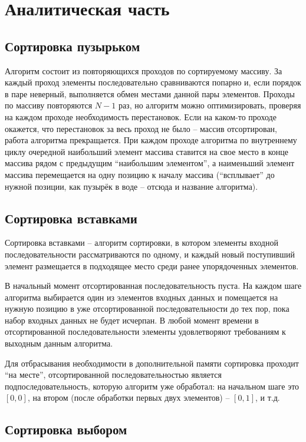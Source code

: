 \chapter{Аналитическая часть}

\section{Сортировка пузырьком}

Алгоритм состоит из повторяющихся проходов по сортируемому массиву.
За каждый проход элементы последовательно сравниваются попарно и, если порядок в паре неверный, выполняется обмен местами данной пары элементов.
Проходы по массиву повторяются $N-1$ раз, но алгоритм можно оптимизировать, проверяя на каждом проходе необходимость перестановок. Если на каком-то проходе окажется, что перестановок за весь проход не было -- массив отсортирован, работа алгоритма прекращается.
При каждом проходе алгоритма по внутреннему циклу очередной наибольший элемент массива ставится на свое место в конце массива рядом с предыдущим ``наибольшим элементом'', а наименьший элемент массива перемещается на одну позицию к началу массива (``всплывает'' до нужной позиции, как пузырёк в воде -- отсюда и название алгоритма).

\section{Сортировка вставками}

Сортировка вставками -- алгоритм сортировки, в котором элементы входной последовательности рассматриваются по одному, и каждый новый поступивший элемент размещается в подходящее место среди ранее упорядоченных элементов.

В начальный момент отсортированная последовательность пуста.
На каждом шаге алгоритма выбирается один из элементов входных данных и помещается на нужную позицию в уже отсортированной последовательности до тех пор, пока набор входных данных не будет исчерпан.
В любой момент времени в отсортированной последовательности элементы удовлетворяют требованиям к выходным данным алгоритма.

Для отбрасывания необходимости в дополнительной памяти сортировка проходит ``на месте'', отсортированной последовательностью является подпоследовательность, которую алгоритм уже обработал: на начальном шаге это $[0, 0]$, на втором (после обработки первых двух элементов) -- $[0, 1]$, и т.д.

\section{Сортировка выбором}


